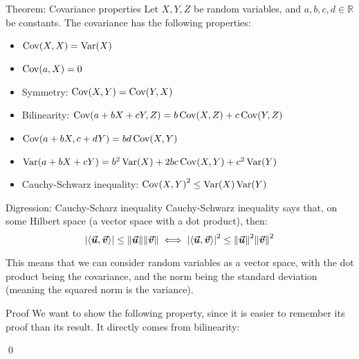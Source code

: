 \documentclass[a4paper]{article}
\begin{document}
\begin{parag}{Theorem: Covariance properties}
    Let $X, Y, Z$ be random variables, and $a, b, c, d \in \mathbb{R}$ be constants. The covariance has the following properties:
    \begin{itemize}
        \item $\Cov\left(X, X\right) = \Var\left(X\right)$
        \item $\Cov\left(a, X\right) = 0$
        \item Symmetry: $\Cov\left(X, Y\right) = \Cov\left(Y, X\right)$
        \item Bilinearity: $\Cov\left(a + bX + cY, Z\right) = b\Cov\left(X, Z\right) + c\Cov\left(Y, Z\right)$
        \item $\Cov\left(a + bX, c + dY\right) = bd\Cov\left(X, Y\right)$
        \item $\Var\left(a + bX + cY\right) = b^2 \Var\left(X\right) + 2bc\Cov\left(X, Y\right) + c^2 \Var\left(Y\right)$
        \item Cauchy-Schwarz inequality: $\Cov\left(X, Y\right)^2 \leq \Var\left(X\right)\Var\left(Y\right)$
    \end{itemize}
    
    
    \begin{subparag}{Digression: Cauchy-Scharz inequality}
        Cauchy-Schwarz inequality says that, on some Hilbert space (a vector space with a dot product), then: 
        \[\left|\left\langle \bvec{u}, \bvec{v} \right\rangle\right| \leq \left\|\bvec{u}\right\| \left\|\bvec{v}\right\| \iff \left|\left\langle \bvec{u}, \bvec{v} \right\rangle\right|^2 \leq \left\|\bvec{u}\right\|^2 \left\|\bvec{v}\right\|^2\]
        
        This means that we can consider random variables as a vector space, with the dot product being the covariance, and the norm being the standard deviation (meaning the squared norm is the variance).
    \end{subparag}

    \begin{subparag}{Proof}
        We want to show the following property, since it is easier to remember its proof than its result. It directly comes from bilinearity:

        \qed
    \end{subparag}
\end{parag}
\end{document}
